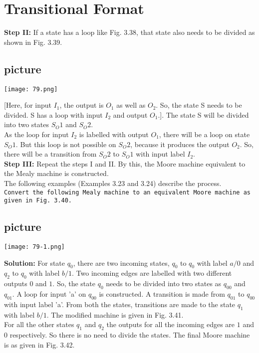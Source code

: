 \documentclass{article}
\begin{document}
\section*{Transitional Format}

\vspace*{1cm}

\textbf{Step II:} If a state has a loop like Fig. 3.38, that state also needs to be divided as shown in Fig. 3.39.

\begin{center}
\section{picture}
\texttt{[image: 79.png]}
\end{center}
[Here, for input $I_1$, the output is $O_1$ as well as $O_2$. So, the state S needs to be divided. S has a loop with
input $I_2$ and output $O_1$.]. The state S will be divided into two states $S_O1$ and $S_O2$.\\

As the loop for input $I_2$
is labelled with output $O_1$, there will be a loop on state $S_O1$. But this loop is not possible on $S_O2$, because
it produces the output $O_2$. So, there will be a transition from $S_O2$ to $S_O1$ with input label $I_2$.\\

\vspace*{0.3cm}
\textbf{Step III:} Repeat the steps I and II. By this, the Moore machine equivalent to the Mealy machine is
constructed.\\
 \hspace*{0.3cm} The following examples (Examples 3.23 and 3.24) describe the process.\\

 \hspace*{0.1cm} \texttt{Convert the following Mealy machine
to an equivalent Moore machine as given in Fig. 3.40.}\\

\begin{center}
\section{picture}
\texttt{[image: 79-1.png]}
\end{center}

\textbf{Solution:} For state $q_0$, there are two incoming states, $q_0$ to
$q_0$ with label $a/0$ and $q_2$ to $q_0$ with label $b/1$. Two incoming
edges are labelled with two different outputs $0$ and $1$. So,
the state $q_0$ needs to be divided into two states as $q_00$ and
$q_01$. A loop for input 'a' on $q_00$ is constructed. A transition
is made from $q_01$ to $q_00$ with input label 'a'. From both the
states, transitions are made to the state $q_1$ with label $b/1$.
The modified machine is given in Fig. 3.41.\\
\hspace*{0.3cm} For all the other states $q_1$ and $q_2$ the outputs for all the incoming edges are $1$ and $0$ respectively. So
there is no need to divide the states. The final Moore machine is as given in Fig. 3.42.
\end{document}

